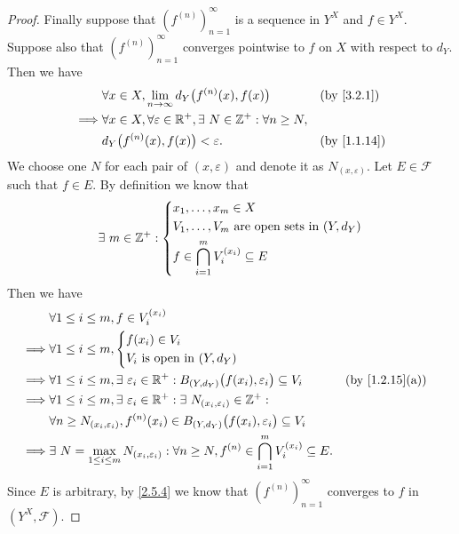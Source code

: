 \begin{proof}
  Finally suppose that \((f^{(n)})_{n = 1}^\infty\) is a sequence in \(Y^X\) and \(f \in Y^X\).
  Suppose also that \((f^{(n)})_{n = 1}^\infty\) converges pointwise to \(f\) on \(X\) with respect to \(d_Y\).
  Then we have
  \begin{align*}
             & \forall x \in X, \lim_{n \to \infty} d_Y\big(f^{(n)}(x), f(x)\big)                     &  & \by{3.2.1}                \\
    \implies & \forall x \in X, \forall \varepsilon \in \R^+, \exists\ N \in \Z^+ : \forall n \geq N,                                \\
             & d_Y\big(f^{(n)}(x), f(x)\big) < \varepsilon.                                           &  & \text{(by \cref{1.1.14})}
  \end{align*}
  We choose one \(N\) for each pair of \((x, \varepsilon)\) and denote it as \(N_{(x, \varepsilon)}\).
  Let \(E \in \mathcal{F}\) such that \(f \in E\).
  By definition we know that
  \[
    \exists\ m \in \mathbb{Z}^+ : \begin{dcases}
      x_1, \dots, x_m \in X                              \\
      V_1, \dots, V_m \text{ are open sets in } (Y, d_Y) \\
      f \in \bigcap_{i = 1}^m V_i^{(x_i)} \subseteq E
    \end{dcases}
  \]
  Then we have
  \begin{align*}
             & \forall 1 \leq i \leq m, f \in V_i^{(x_i)}                                                                                                                                \\
    \implies & \forall 1 \leq i \leq m, \begin{dcases}
                                          f(x_i) \in V_i \\
                                          V_i \text{ is open in } (Y, d_Y)
                                        \end{dcases}                                                                                                                  \\
    \implies & \forall 1 \leq i \leq m, \exists\ \varepsilon_i \in \R^+ : B_{(Y, d_Y)}\big(f(x_i), \varepsilon_i\big) \subseteq V_i                    &  & \text{(by \cref{1.2.15}(a))} \\
    \implies & \forall 1 \leq i \leq m, \exists\ \varepsilon_i \in \R^+ : \exists\ N_{(x_i, \varepsilon_i)} \in \Z^+ :                                                                   \\
             & \forall n \geq N_{(x_i, \varepsilon_i)}, f^{(n)}(x_i) \in B_{(Y, d_Y)}\big(f(x_i), \varepsilon_i\big) \subseteq V_i                                                       \\
    \implies & \exists\ N = \max_{1 \leq i \leq m} N_{(x_i, \varepsilon_i)} : \forall n \geq N, f^{(n)} \in \bigcap_{i = 1}^m V_i^{(x_i)} \subseteq E.
  \end{align*}
  Since \(E\) is arbitrary, by \cref{2.5.4} we know that \((f^{(n)})_{n = 1}^\infty\) converges to \(f\) in \((Y^X, \mathcal{F})\).
\end{proof}